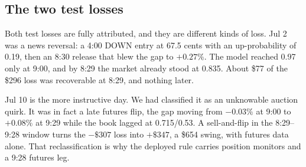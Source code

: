 \subsection{The two test losses}
\label{app:execution_losses}

Both test losses are fully attributed, and they are different kinds of
loss. Jul 2 was a news reversal: a 4:00 DOWN entry at 67.5 cents with an
up-probability of 0.19, then an 8:30 release that blew the gap to
$+0.27\%$. The model reached 0.97 only at 9:00, and by 8:29 the market
already stood at 0.835. About \$77 of the \$296 loss was recoverable at
8:29, and nothing later.

Jul 10 is the more instructive day. We had classified it as an unknowable
auction quirk. It was in fact a late futures flip, the gap moving from
$-0.03\%$ at 9:00 to $+0.08\%$ at 9:29 while the book lagged at
0.715/0.53. A sell-and-flip in the 8:29--9:28 window turns the $-\$307$
loss into $+\$347$, a \$654 swing, with futures data alone. That
reclassification is why the deployed rule carries position monitors and a
9:28 futures leg.
